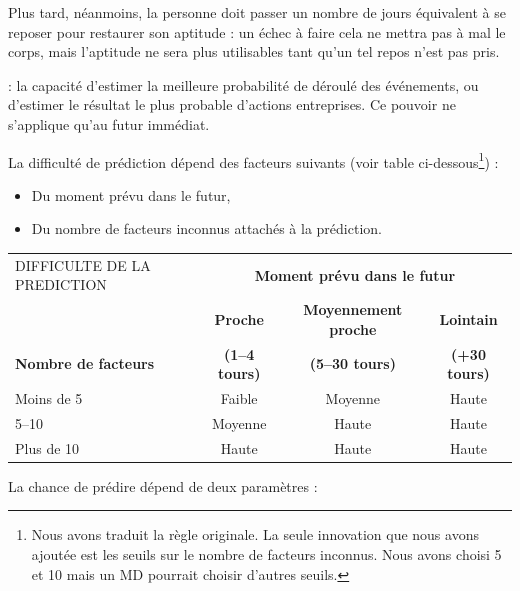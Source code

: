 \documentclass[11pt]{article}
\newcommand{\uline}[1]{\underline{\smash{#1}\vphantom{T}}\vphantom{#1}}
\begin{document}
{\bigskip

Plus tard, néanmoins, la personne doit passer un nombre de jours équivalent à se reposer pour restaurer son aptitude : un échec à faire cela ne mettra pas à mal le corps, mais l'aptitude ne sera plus utilisables tant qu'un tel repos n'est pas pris.

\bigskip

\label{guerrier-premonition}\textbf{\uline{Prémonition (spécial)}} : la capacité d'estimer la meilleure probabilité de déroulé des événements, ou d'estimer le résultat le plus probable d'actions entreprises. Ce pouvoir ne s'applique qu'au futur immédiat.

\bigskip

La difficulté de prédiction dépend des facteurs suivants (voir table ci-dessous\footnote{Nous avons traduit la règle originale. La seule innovation que nous avons ajoutée est les seuils sur le nombre de facteurs inconnus. Nous avons choisi 5 et 10 mais un MD pourrait choisir d'autres seuils.}) :

\bigskip

\begin{itemize}
\item Du moment prévu dans le futur,
\item Du nombre de facteurs inconnus attachés à la prédiction.
\end{itemize}

\bigskip

\begin{tabular}{lccc}
DIFFICULTE DE LA PREDICTION & \multicolumn{3}{c}{\textbf{Moment prévu dans le futur}} \\
                    & \textbf{Proche}        & \textbf{Moyennement proche}    & \textbf{Lointain}  \\
\textbf{Nombre de facteurs}  & \textbf{(1--4 tours)}  & \textbf{(5--30 tours) }  & \textbf{(+30 tours)} \\
Moins de 5          & Faible        & Moyenne               & Haute \\
5--10               & Moyenne       & Haute                 & Haute \\
Plus de 10          & Haute         & Haute                 & Haute \\
\end{tabular}

\bigskip

La chance de prédire dépend de deux paramètres :

\bigskip

}
\end{document}
